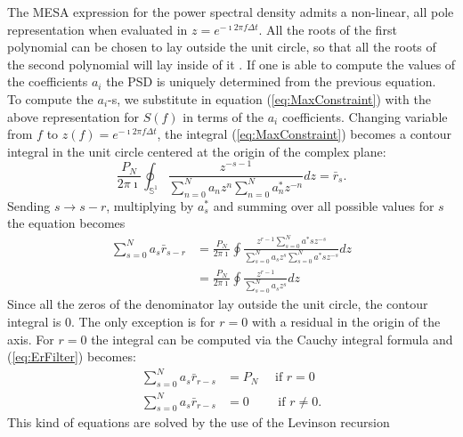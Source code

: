 \documentclass[twocolumn,showpacs,preprintnumbers,nofootinbib,prd,
superscriptaddress,10pt]{revtex4-1}
\begin{document}
The MESA expression for the power spectral density admits a non-linear, all pole representation when evaluated in $z = e^{-\imath 2 \pi f \Delta t}$. All the roots of the first polynomial can be chosen to lay outside the unit circle, so that all the roots of the second polynomial will lay inside of it \cite{1975STIN...7714318B}. 
If one is able to compute the values of the coefficients $a_i$ the PSD is uniquely determined from the previous equation. \\ 
To compute the $a_i$-s, we substitute in equation
(\ref{eq:MaxConstraint}) with the above representation for $S(f)$ in terms of the $a_i$ coefficients. Changing  variable from $f$ to $z(f) = e^{-\imath 2 \pi f \Delta t}$, the integral (\ref{eq:MaxConstraint}) becomes a contour integral in the unit circle centered at the origin of the complex plane: 
\begin{equation}
   \frac{P_N}{2 \pi \imath} \oint _{\mathbb S^1}\frac{z^{-s - 1}}{\sum_{n = 0}^N a_n z^n \sum_{n = 0}^N a^*_n z^{-n}}dz = \bar r_s. 
\end{equation}
Sending $s \to s - r$, multiplying by $a^*_s$ and summing over all possible values for $s$ the equation becomes 
\begin{align} \nonumber 
    \sum_{s = 0}^N a_s \bar r_{s - r} &= \frac{P_N}{2 \pi \imath}\oint \frac{z^{r - 1} \sum_{s = 0}^N a^*s z^{-s}}{\sum_{s = 0}^N a_s z^s \sum_{s = 0}^N a^*s z^{-s}} dz\\
    & = \frac{P_N}{2 \pi \imath}\oint \frac{z^{r -1}}{\sum_{s = 0}^N a_s z^s}dz\label{eq:ErFilter}
\end{align}
Since all the zeros of the denominator lay outside the unit circle, the contour integral is 0. The only exception is for $r = 0$ with a residual in the origin of the axis. For $r = 0$ the integral can be computed via the Cauchy integral formula and (\ref{eq:ErFilter}) becomes: 
\begin{align}\label{eq:errorFilter1}
    \sum_{s = 0}^N a_s \bar r_{r - s} &= P_N \quad \text{ if } r = 0 \\ \label{eq:errorFilter2}
    \sum_{s = 0}^N a_s \bar r_{r - s} & = 0 \qquad \text{ if } r \neq 0.
\end{align}
This kind of equations are solved by the use of the Levinson recursion \cite{doi:10.1002/sapm1946251261}
\end{document}

